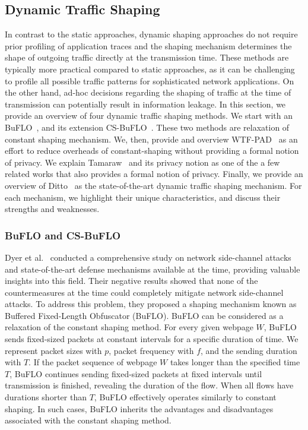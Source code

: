 \subsection{Dynamic Traffic Shaping}\label{subsec:dynamic-traffic-shaping}
In contrast to the static approaches, dynamic shaping approaches do not require prior profiling of application traces and the shaping mechanism determines the shape of outgoing traffic directly at the transmission time.
These methods are typically more practical compared to static approaches, as it can be challenging to profile all possible traffic patterns for sophisticated network applications.
On the other hand, ad-hoc decisions regarding the shaping of traffic at the time of transmission can potentially result in information leakage.
In this section, we provide an overview of four dynamic traffic shaping methods.
We start with an BuFLO~\cite{dyer2012peek}, and its extension CS-BuFLO~\cite{cai2014csbuflo}. These two methods are relaxation of constant shaping mechanism.
We, then, provide and overview WTF-PAD~\cite{juarez2016toward} as an effort to reduce overheads of constant-shaping without providing a formal notion of privacy.
We explain Tamaraw~\cite{cai2014systematic} and its privacy notion as one of the a few related works that also provides a formal notion of privacy.
Finally, we provide an overview of Ditto~\cite{meier2022ditto} as the state-of-the-art dynamic traffic shaping mechanism.  
For each mechanism, we highlight their unique characteristics, and discuss their strengths and weaknesses.



\subsubsection{BuFLO and CS-BuFLO}\label{subsubsec:buflo}
Dyer et al.~\cite{dyer2012peek} conducted a comprehensive study on network side-channel attacks and state-of-the-art defense mechanisms available at the time, providing valuable insights into this field. 
Their negative results showed that none of the countermeasures at the time could completely mitigate network side-channel attacks.
To address this problem, they proposed a shaping mechanism known as Buffered Fixed-Length Obfuscator (BuFLO).
BuFLO can be considered as a relaxation of the constant shaping method.
For every given webpage $W$, BuFLO sends fixed-sized packets at constant intervals for a specific duration of time.
We represent packet sizes with $p$, packet frequency with $f$, and the sending duration with $T$. 
If the packet sequence of webpage $W$ takes longer than the specified time $T$, BuFLO continues sending fixed-sized packets at fixed intervals until transmission is finished, revealing the duration of the flow. 
When all flows have durations shorter than $T$, BuFLO effectively operates similarly to constant shaping.
In such cases, BuFLO inherits the advantages and disadvantages associated with the constant shaping method.~\cite{sirinam2018df}

